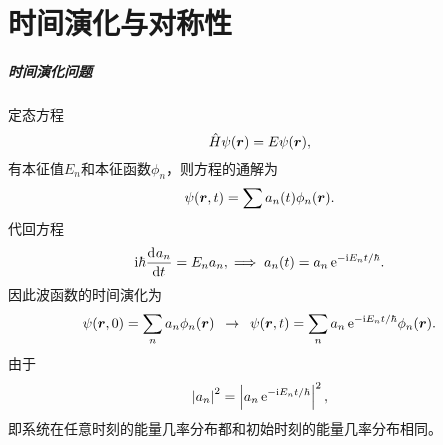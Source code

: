 \chapter{时间演化与对称性}
\paragraph{时间演化问题}
定态\Schr 方程
\[
	\hat H\psi(\bm r)=E\psi(\bm r),
\]
有本征值$E_n$和本征函数$\phi_n$，则\Schr 方程的通解为
\[
	\psi(\bm r,t)=\sum a_n(t)\phi_n(\bm r).
\]
代回\Schr 方程
\[
	\mathrm{i}\hbar\frac{\mathrm{d}^{{}}a_n}{\mathrm{d}{t}^{{}}}=E_na_n,\implies a_n(t)=a_n\mathop{}\!\mathrm{e}^{-\mathrm{i} E_nt/\hbar}.
\]
因此波函数的时间演化为
\[
	\psi(\bm r,0)=\sum_n a_n\phi_n(\bm r)\enspace\rightarrow\enspace\psi(\bm r,t)=\sum_n a_n\mathop{}\!\mathrm{e}^{-\mathrm{i} E_nt/\hbar}\phi_n(\bm r).
\]
由于
\[
	\left\lvert a_n\right\rvert^2=\left\lvert a_n\mathop{}\!\mathrm{e}^{-\mathrm{i} E_nt/\hbar}\right\rvert^2,
\]
即系统在任意时刻的能量几率分布都和初始时刻的能量几率分布相同。

